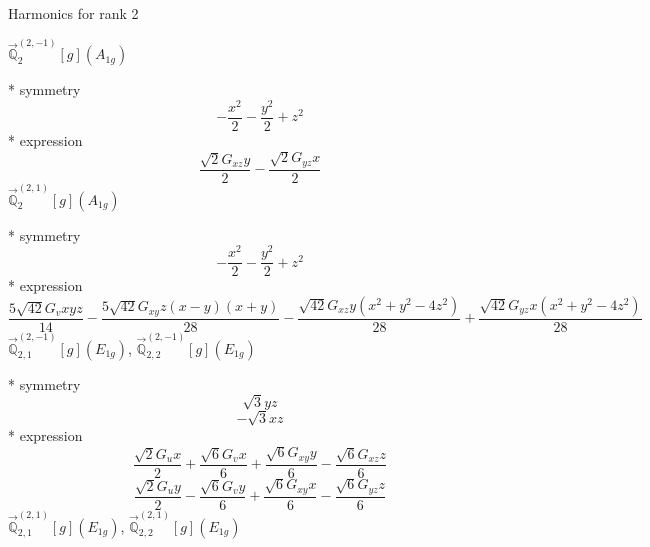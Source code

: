 \documentclass[fleqn,8pt]{jsarticle}
\begin{document}
\noindent * Harmonics for rank 2

\noindent\quad $\vec{\mathbb{Q}}_{2}^{(2,-1)}[g](A_{1g})$

\noindent\quad ** symmetry
\begin{dmath*}
- \frac{x^{2}}{2} - \frac{y^{2}}{2} + z^{2}
\end{dmath*}
\noindent\quad ** expression
\begin{dmath*}
\frac{\sqrt{2} G_{xz} y}{2} - \frac{\sqrt{2} G_{yz} x}{2}
\end{dmath*}
\noindent\quad $\vec{\mathbb{Q}}_{2}^{(2,1)}[g](A_{1g})$

\noindent\quad ** symmetry
\begin{dmath*}
- \frac{x^{2}}{2} - \frac{y^{2}}{2} + z^{2}
\end{dmath*}
\noindent\quad ** expression
\begin{dmath*}
\frac{5 \sqrt{42} G_{v} x y z}{14} - \frac{5 \sqrt{42} G_{xy} z \left(x - y\right) \left(x + y\right)}{28} - \frac{\sqrt{42} G_{xz} y \left(x^{2} + y^{2} - 4 z^{2}\right)}{28} + \frac{\sqrt{42} G_{yz} x \left(x^{2} + y^{2} - 4 z^{2}\right)}{28}
\end{dmath*}
\noindent\quad $\vec{\mathbb{Q}}_{2,1}^{(2,-1)}[g](E_{1g})$, $\vec{\mathbb{Q}}_{2,2}^{(2,-1)}[g](E_{1g})$

\noindent\quad ** symmetry
\begin{dmath*}
\sqrt{3} y z
\end{dmath*}
\begin{dmath*}
- \sqrt{3} x z
\end{dmath*}
\noindent\quad ** expression
\begin{dmath*}
\frac{\sqrt{2} G_{u} x}{2} + \frac{\sqrt{6} G_{v} x}{6} + \frac{\sqrt{6} G_{xy} y}{6} - \frac{\sqrt{6} G_{xz} z}{6}
\end{dmath*}
\begin{dmath*}
\frac{\sqrt{2} G_{u} y}{2} - \frac{\sqrt{6} G_{v} y}{6} + \frac{\sqrt{6} G_{xy} x}{6} - \frac{\sqrt{6} G_{yz} z}{6}
\end{dmath*}
\noindent\quad $\vec{\mathbb{Q}}_{2,1}^{(2,1)}[g](E_{1g})$, $\vec{\mathbb{Q}}_{2,2}^{(2,1)}[g](E_{1g})$
\end{document}
